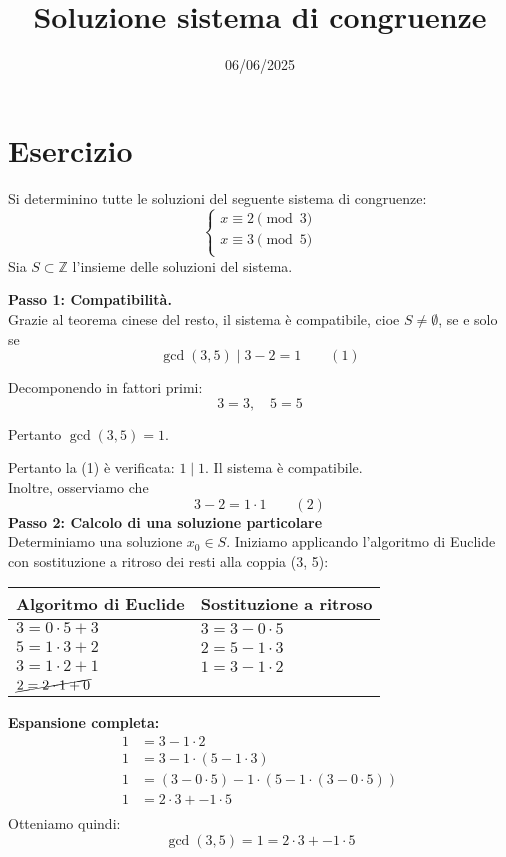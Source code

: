 \documentclass[12pt]{article}
\begin{document}
\title{Soluzione sistema di congruenze}
\date{06/06/2025}
\maketitle
\section*{Esercizio}
Si determinino tutte le soluzioni del seguente sistema di congruenze:
\[
\begin{cases}
x \equiv 2 \pmod{3} \\
x \equiv 3 \pmod{5} \\
\end{cases}
\]
Sia $S \subset \mathbb{Z}$ l'insieme delle soluzioni del sistema.

\textbf{Passo 1: Compatibilità.} \\ 
Grazie al teorema cinese del resto, il sistema è compatibile, cioe $S \neq \emptyset$, se e solo se
$$\gcd(3, 5) \mid 3 - 2 = 1 \qquad (1)$$

Decomponendo in fattori primi:
$$3 = 3, \quad 5 = 5$$

Pertanto $\gcd(3, 5) = 1$.

Pertanto la (1) è verificata: $1 \mid 1$. Il sistema è compatibile.\\
Inoltre, osserviamo che $$3 - 2 = 1 \cdot 1 \qquad (2)$$
\textbf{Passo 2: Calcolo di una soluzione particolare} \\
Determiniamo una soluzione $x_0 \in S$.
Iniziamo applicando l'algoritmo di Euclide con sostituzione a ritroso dei resti alla coppia (3, 5):
\begin{center}
\setlength{\arrayrulewidth}{0.5pt}
\begin{tabular}{|p{5cm}|p{9cm}|}
\hline
\textbf{Algoritmo di Euclide} & \textbf{Sostituzione a ritroso} \\
\hline
$3 = 0 \cdot  5 + 3$ & $3 = 3 - 0 \cdot  5$ \\
\hline
$5 = 1 \cdot  3 + 2$ & $2 = 5 - 1 \cdot  3$ \\
\hline
$3 = 1 \cdot  2 + 1$ & $1 = 3 - 1 \cdot  2$ \\
\hline
$\cancel{2 = 2 \cdot  1 + 0}$ & \\
\hline
\end{tabular}
\end{center}
\textbf{Espansione completa:}
\begin{align*}
1 &= 3 - 1\cdot2\\
1 &= 3 - 1\cdot(5 - 1\cdot3)\\
1 &= (3 - 0\cdot5) - 1\cdot(5 - 1\cdot(3 - 0\cdot5))\\
1 &= 2\cdot3 + -1\cdot5\\
\end{align*}
Otteniamo quindi: $$\gcd(3, 5) = 1 = 2 \cdot 3 + -1 \cdot 5$$
\end{document}
